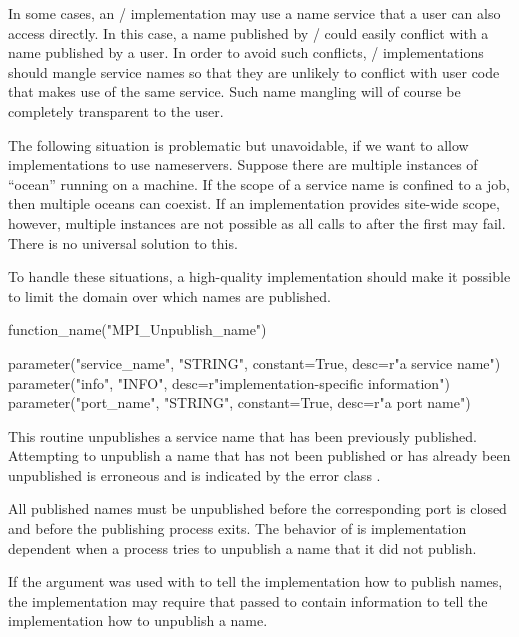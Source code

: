 \begin{implementors}
In some cases, an \MPI/ implementation may use a name service
that a user can also access directly. In this case, a name
published by \MPI/ could easily conflict with a name
published by a user. In order to avoid such
conflicts, \MPI/ implementations should mangle service names
so that they are unlikely to conflict with user code that
makes use of the same service. Such name mangling will
of course be completely transparent to the user.


The following situation is problematic but unavoidable, if
we want to allow implementations to use nameservers.
Suppose there are multiple instances of ``ocean'' running
on a machine. If the scope of a service name is confined to
a job, then multiple oceans can coexist. If an implementation
provides site-wide scope, however, multiple instances are
not possible as all calls to  after
the first may fail. There is no universal solution to this.

To handle these situations,
a high-quality implementation should make it possible to
limit the domain over which names are published.
\end{implementors}


%
\begin{mpi-binding}
    function_name("MPI_Unpublish_name")

    parameter("service_name", "STRING", constant=True, desc=r"a service name")
    parameter("info", "INFO", desc=r"implementation-specific information")
    parameter("port_name", "STRING", constant=True, desc=r"a port name")
\end{mpi-binding}

This routine unpublishes a service name that has been previously
published.  Attempting to unpublish a name that has not been published
or has already been unpublished is erroneous and is indicated by the error class
.

All published names must be unpublished before the corresponding
port is closed and before the publishing process exits.
The behavior of  is implementation dependent
when a process tries to unpublish a name that it did not publish.

If the  argument was used with
 to tell the implementation
how to publish names, the implementation may require that
 passed to  contain information
to tell the implementation how to unpublish a name.





